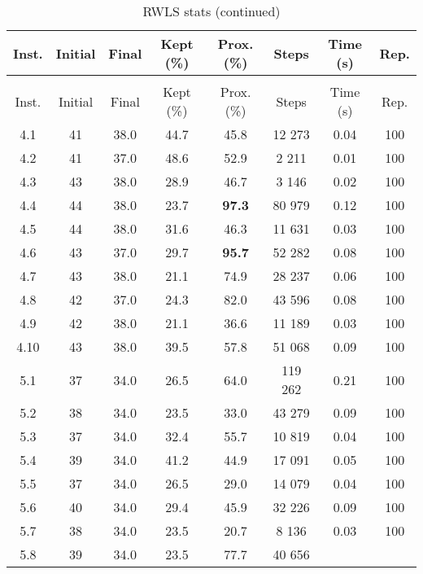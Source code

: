 \begin{longtable}{@{\extracolsep{5pt}}cccccccc}
	\caption{RWLS stats}\\
	\toprule
	Inst. & Initial & Final & Kept (\%) & Prox. (\%) & Steps & Time (s) & Rep.\\
	\midrule
	\endfirsthead
	\caption[]{RWLS stats (continued)}\\
	\toprule
	Inst. & Initial & Final & Kept (\%) & Prox. (\%) & Steps & Time (s) & Rep.\\
	\midrule
	\endhead
	\bottomrule
	\endfoot
	4.1
	&
	41
	&
	38.0
	&
	44.7
	&
	45.8
	&
	12 273
	&
	0.04
	&
	100
	\\
	4.2
	&
	41
	&
	37.0
	&
	48.6
	&
	52.9
	&
	2 211
	&
	0.01
	&
	100
	\\
	4.3
	&
	43
	&
	38.0
	&
	28.9
	&
	46.7
	&
	3 146
	&
	0.02
	&
	100
	\\
	4.4
	&
	44
	&
	38.0
	&
	23.7
	&
	\textbf{97.3}
	&
	80 979
	&
	0.12
	&
	100
	\\
	4.5
	&
	44
	&
	38.0
	&
	31.6
	&
	46.3
	&
	11 631
	&
	0.03
	&
	100
	\\
	4.6
	&
	43
	&
	37.0
	&
	29.7
	&
	\textbf{95.7}
	&
	52 282
	&
	0.08
	&
	100
	\\
	4.7
	&
	43
	&
	38.0
	&
	21.1
	&
	74.9
	&
	28 237
	&
	0.06
	&
	100
	\\
	4.8
	&
	42
	&
	37.0
	&
	24.3
	&
	82.0
	&
	43 596
	&
	0.08
	&
	100
	\\
	4.9
	&
	42
	&
	38.0
	&
	21.1
	&
	36.6
	&
	11 189
	&
	0.03
	&
	100
	\\
	4.10
	&
	43
	&
	38.0
	&
	39.5
	&
	57.8
	&
	51 068
	&
	0.09
	&
	100
	\\
	5.1
	&
	37
	&
	34.0
	&
	26.5
	&
	64.0
	&
	119 262
	&
	0.21
	&
	100
	\\
	5.2
	&
	38
	&
	34.0
	&
	23.5
	&
	33.0
	&
	43 279
	&
	0.09
	&
	100
	\\
	5.3
	&
	37
	&
	34.0
	&
	32.4
	&
	55.7
	&
	10 819
	&
	0.04
	&
	100
	\\
	5.4
	&
	39
	&
	34.0
	&
	41.2
	&
	44.9
	&
	17 091
	&
	0.05
	&
	100
	\\
	5.5
	&
	37
	&
	34.0
	&
	26.5
	&
	29.0
	&
	14 079
	&
	0.04
	&
	100
	\\
	5.6
	&
	40
	&
	34.0
	&
	29.4
	&
	45.9
	&
	32 226
	&
	0.09
	&
	100
	\\
	5.7
	&
	38
	&
	34.0
	&
	23.5
	&
	20.7
	&
	8 136
	&
	0.03
	&
	100
	\\
	5.8
	&
	39
	&
	34.0
	&
	23.5
	&
	77.7
	&
	40 656
	&

\end{longtable}
